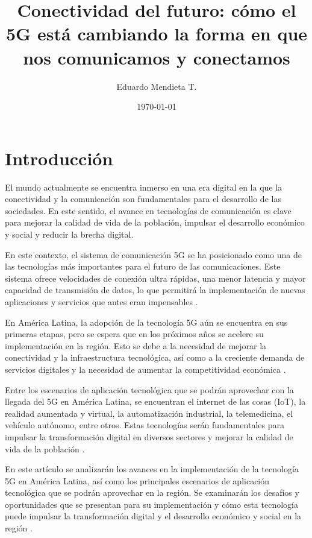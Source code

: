 \documentclass[12pt]{article}
\title{Conectividad del futuro: cómo el 5G está cambiando la forma en que nos comunicamos y conectamos}
\author{Eduardo Mendieta T.}
\date{\today}
\begin{document}
    \maketitle

    \section{Introducción}

        El mundo actualmente se encuentra inmerso en una era digital en la que la conectividad y la comunicación son fundamentales para el desarrollo de las sociedades. En este sentido, el avance en tecnologías de comunicación es clave para mejorar la calidad de vida de la población, impulsar el desarrollo económico y social y reducir la brecha digital.
        
        En este contexto, el sistema de comunicación 5G se ha posicionado como una de las tecnologías más importantes para el futuro de las comunicaciones. Este sistema ofrece velocidades de conexión ultra rápidas, una menor latencia y mayor capacidad de transmisión de datos, lo que permitirá la implementación de nuevas aplicaciones y servicios que antes eran impensables \cite{ali2021impact}.
        
        En América Latina, la adopción de la tecnología 5G aún se encuentra en sus primeras etapas, pero se espera que en los próximos años se acelere su implementación en la región. Esto se debe a la necesidad de mejorar la conectividad y la infraestructura tecnológica, así como a la creciente demanda de servicios digitales y la necesidad de aumentar la competitividad económica \cite{wang2021intelligent}.
        
        Entre los escenarios de aplicación tecnológica que se podrán aprovechar con la llegada del 5G en América Latina, se encuentran el internet de las cosas (IoT), la realidad aumentada y virtual, la automatización industrial, la telemedicina, el vehículo autónomo, entre otros. Estas tecnologías serán fundamentales para impulsar la transformación digital en diversos sectores y mejorar la calidad de vida de la población \cite{ali2021impact}.
        
        En este artículo se analizarán los avances en la implementación de la tecnología 5G en América Latina, así como los principales escenarios de aplicación tecnológica que se podrán aprovechar en la región. Se examinarán los desafíos y oportunidades que se presentan para su implementación y cómo esta tecnología puede impulsar la transformación digital y el desarrollo económico y social en la región \cite{ali2021impact}.
        \newpage
\end{document}

